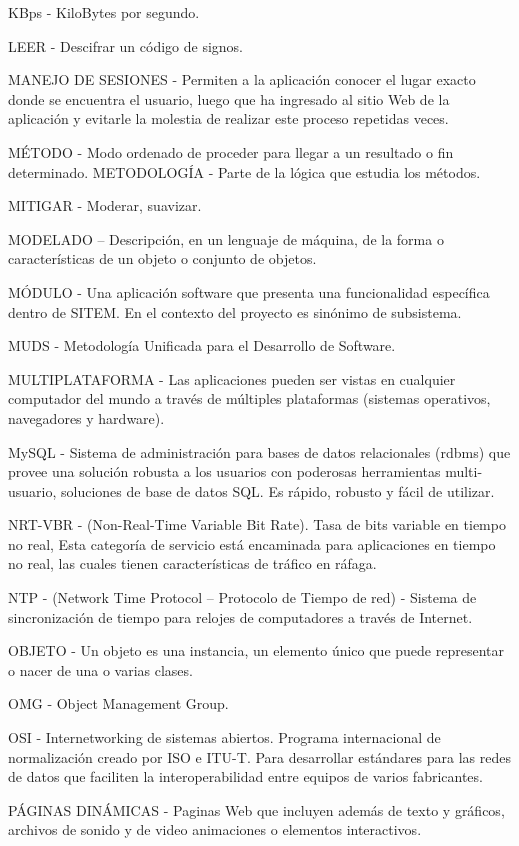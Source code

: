 KBps -  KiloBytes por segundo.

LEER - Descifrar un código de signos.

MANEJO DE SESIONES - Permiten a la aplicación conocer el lugar exacto donde se encuentra el usuario, luego que ha ingresado al sitio Web de la aplicación y evitarle la molestia de realizar este proceso repetidas veces.

MÉTODO - Modo ordenado de proceder para llegar a un resultado o fin determinado. 
METODOLOGÍA - Parte de la lógica que estudia los métodos.

MITIGAR - Moderar, suavizar.

MODELADO – Descripción, en un lenguaje de máquina, de la forma o características de un objeto o conjunto de objetos.

MÓDULO - Una aplicación software que presenta una funcionalidad específica dentro de SITEM. En el contexto del proyecto es sinónimo de subsistema.

MUDS - Metodología Unificada para el Desarrollo de Software.

MULTIPLATAFORMA -  Las aplicaciones pueden ser vistas en cualquier computador del mundo a través de múltiples plataformas (sistemas operativos, navegadores y hardware).

MySQL -  Sistema de administración para bases de datos relacionales (rdbms) que provee una solución robusta a los usuarios con poderosas herramientas multi-usuario, soluciones de base de datos SQL. Es rápido, robusto y fácil de utilizar.

NRT-VBR - (Non-Real-Time Variable Bit Rate). Tasa de bits variable en tiempo no real, Esta categoría de servicio está encaminada para aplicaciones en tiempo no real, las cuales tienen características de tráfico en ráfaga.

NTP - (Network Time Protocol – Protocolo de Tiempo de red) - Sistema de sincronización de tiempo para relojes de computadores a través de Internet.

OBJETO -  Un objeto es una instancia, un elemento único que puede representar o nacer de una o varias clases.

OMG - Object Management Group.

OSI - Internetworking de sistemas abiertos. Programa internacional de normalización creado por ISO e ITU-T. Para desarrollar estándares para las redes de datos que faciliten la interoperabilidad entre equipos de varios fabricantes.

PÁGINAS DINÁMICAS - Paginas Web que incluyen además de texto y gráficos, archivos de sonido y de video animaciones o elementos interactivos.

